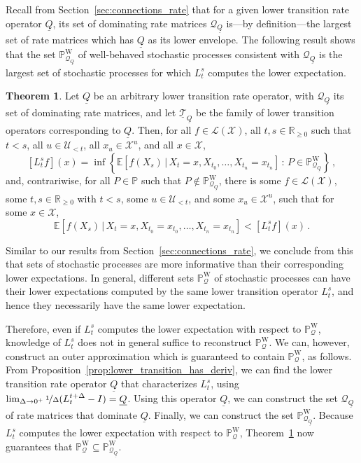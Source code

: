\documentclass[10pt]{paper}
\theoremstyle{definition}
\newtheorem{theorem}{Theorem}
\newcommand{\reals}{\mathbb{R}}
\newcommand{\realsnonneg}{\reals_{\geq 0}}
\newcommand{\states}{\mathcal{X}}
\newcommand{\processes}{\mathbb{P}}
\newcommand{\wprocesses}{\processes^{\mathrm{W}}}
\newcommand{\gambles}{\mathcal{L}}
\newcommand{\gamblesX}{\gambles(\states)}
\newcommand{\rateset}{\mathcal{Q}}
\newcommand{\lrate}{\underline{Q}}
\begin{document}
Recall from Section~\ref{sec:connections_rate} that for a given lower transition rate operator $\lrate$, its set of dominating rate matrices $\rateset_{\lrate}$ is---by definition---the largest set of rate matrices which has $\lrate$ as its lower envelope. The following result shows that the set $\wprocesses_{\rateset_{\lrate}}$ of well-behaved stochastic processes consistent with $\rateset_{\lrate}$ is the largest set of stochastic processes for which $L_t^s$ computes the lower expectation.

\begin{theorem}\label{theo:dominating_rate_processes_max_set}
Let $\lrate$ be an arbitrary lower transition rate operator, with $\rateset_{\lrate}$ its set of dominating rate matrices, and let  $\underline{\mathcal{T}}_{\lrate}$ be the family of lower transition operators corresponding to $\lrate$. Then, for all $f\in\gamblesX$, all $t,s\in\realsnonneg$ such that $t<s$, all $u\in\mathcal{U}_{<t}$, all $x_u\in\states^u$, and all $x\in\states$,
\begin{equation*}
\left[L_t^sf\right](x) = \inf\left\{\mathbb{E}[f(X_s)\,\vert\,X_t=x,X_{t_0},\ldots,X_{t_n}=x_{t_n}]\,:\,P\in\wprocesses_{\rateset_{\lrate}}\right\}\,,
\end{equation*}
and, contrariwise, for all $P\in\processes$ such that $P\notin\wprocesses_{\rateset_{\lrate}}$, there is some $f\in\gamblesX$, some $t,s\in\realsnonneg$ with $t<s$, some $u\in\mathcal{U}_{<t}$, and some $x_u\in\states^u$, such that for some $x\in\states$,
\begin{equation*}
\mathbb{E}\left[f(X_s)\,\vert\,X_t=x,X_{t_0}=x_{t_0},\ldots,X_{t_n}=x_{t_n}\right] < \left[L_t^sf\right](x)\,.
\end{equation*}
\end{theorem}

Similar to our results from Section~\ref{sec:connections_rate}, we conclude from this that sets of stochastic processes are more informative than their corresponding lower expectations. In general, different sets $\wprocesses_\rateset$ of stochastic processes can have their lower expectations computed by the same lower transition operator $L_t^s$, and hence they necessarily have the same lower expectation. 

Therefore, even if $L_t^s$ computes the lower expectation with respect to $\wprocesses_\rateset$, knowledge of $L_t^s$ does not in general suffice to reconstruct $\wprocesses_\rateset$. We can, however, construct an outer approximation which is guaranteed to contain $\wprocesses_\rateset$, as follows. From Proposition~\ref{prop:lower_transition_has_deriv}, we can find the lower transition rate operator $\lrate$ that characterizes $L_t^s$, using $\lim_{\Delta\to0^+}\nicefrac{1}{\Delta}(L_t^{t+\Delta}-I)=\lrate$. Using this operator $\lrate$, we can construct the set $\rateset_{\lrate}$ of rate matrices that dominate $\lrate$. Finally, we can construct the set $\wprocesses_{\rateset_{\lrate}}$. Because $L_t^s$ computes the lower expectation with respect to $\wprocesses_\rateset$, Theorem~\ref{theo:dominating_rate_processes_max_set} now guarantees that $\wprocesses_\rateset\subseteq\wprocesses_{\rateset_{\lrate}}$.
\end{document}
